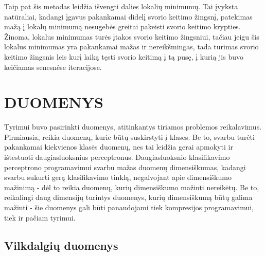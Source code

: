 \documentclass{VUMIFPSbakalaurinis}
\begin{document}
Taip pat šis metodas leidžia išvengti dalies lokalių minimumų.
Tai įvyksta natūraliai, kadangi įgavus pakankamai didelį svorio keitimo žingsnį, patekimas mažą į lokalų minimumą nesugebės greitai pakeisti svorio keitimo krypties.
Žinoma, lokalus minimumas turės įtakos svorio keitimo žingsniui, tačiau jeigu šis lokalus minimumas yra pakankamai mažas ir nereikšmingas, tada turimas svorio keitimo žingsnis leis kurį laiką tęsti svorio keitimą į tą pusę, į kurią jis buvo keičiamas senesnėse iteracijose.




\clearpage
\section{DUOMENYS}

Tyrimui buvo pasirinkti duomenys, atitinkantys tiriamos problemos reikalavimus.
Pirmiausia, reikia duomenų, kurie būtų suskirstyti į klases.
Be to, svarbu turėti pakankamai kiekvienos klasės duomenų, nes tai leidžia gerai apmokyti ir ištestuoti daugiasluoksnius perceptronus.
Daugiasluoksnio klasifikavimo perceptrono programavimui svarbu mažas duomenų dimensiškumas, kadangi svarbu sukurti gerą klasifikavimo tinklą, negalvojant apie dimensiškumo mažinimą - dėl to reikia duomenų, kurių dimensiškumo mažinti nereikėtų.
Be to, reikalingi daug dimensijų turintys duomenys, kurių dimensiškumą būtų galima mažinti - šie duomenys gali būti panaudojami tiek kompresijos programavimui, tiek ir pačiam tyrimui.



\subsection{Vilkdalgių duomenys}
\end{document}
